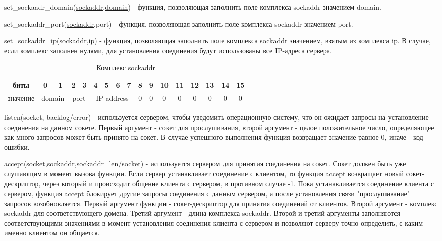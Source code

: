 \documentclass[12t,english,russian]{article}
\begin{document}
\label{set_sockaddr_domain}
set\_sockaadr\_domain(\hyperref[sockaddr]{sockaddr},\hyperref[domain]{domain}) - функция, позволяющая заполнить поле комплекса sockaddr значением domain.

\label{set_sockaddr_port}
set\_sockaddr\_port(\hyperref[sockaddr]{sockaddr},port) - функция, позволяющая заполнить поле комплекса sockaddr значением port.

\label{set_sockaddr_ip}
set\_sockaddr\_ip(\hyperref[sockaddr]{sockaddr},ip) - функция, позволяющая заполнить поле комплекса sockaddr значением, взятым из комплекса ip. В случае, если комплекс заполнен нулями, для установления соединения будут использованы все IP-адреса сервера.

\begin{table}[H]
\caption{\label{sockaddr}Комплекс sockaddr}
\begin{center}
\begin{tabular}{|c|c|c|c|c|c|c|c|c|c|c|c|c|c|c|c|c|}
\hline
биты & 0 & 1 & 2 & 3 & 4 & 5 & 6 & 7 & 8 & 9 & 10 & 11 & 12 & 13 & 14 & 15 \\
\hline
значение & \multicolumn{2}{|c|}{domain} & \multicolumn{2}{|c|}{port} & \multicolumn{4}{|c|}{IP address} & 0 & 0 & 0 & 0 & 0 & 0 & 0 & 0 \\
\hline
\end{tabular}
\end{center}
\end{table}

\label{listen}
listen(\hyperref[socket]{socket}, backlog/\hyperref[error]{error}) - используется сервером, чтобы уведомить операционную систему, что он ожидает запросы на установление соединения на данном сокете. Первый аргумент - сокет для прослушивания, второй аргумент - целое положительное число, определяющее как много запросов может быть принято на сокет. В случае успешного выполнения функция возвращает значение равное 0, иначе - код ошибки.

\label{accept}
accept(\hyperref[socket]{socket},\hyperref[sockaddr]{sockaddr},sockaddr\_len/\hyperref[socket]{socket}) - используется сервером для принятия соединения на сокет. Сокет должен быть уже слушающим в момент вызова функции. Если сервер устанавливает соединение с клиентом, то функция accept возвращает новый сокет-дескриптор, через который и происходит общение клиента с сервером, в противном случае -1. Пока устанавливается соединение клиента с сервером, функция accept блокирует другие запросы соединения с данным сервером, а после установления связи "прослушивание" запросов возобновляется. Первый аргумент функции - сокет-дескриптор для принятия соединений от клиентов. Второй аргумент - комплекс sockaddr для соответствующего домена. Третий аргумент - длина комплекса sockaddr. Второй и третий аргументы заполняются соответствующими значениями в момент установления соединения клиента с сервером и позволяют серверу точно определить, с каким именно клиентом он общается.
\end{document}

